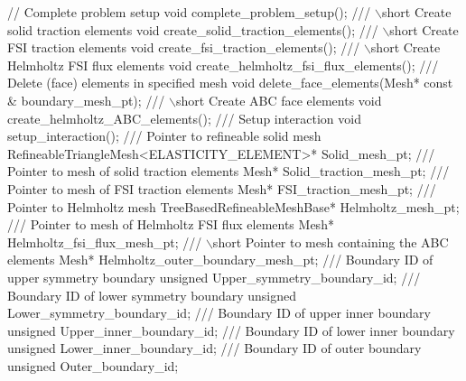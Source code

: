 \begin{DoxyCodeInclude}
 \textcolor{comment}{// Complete problem setup}
 \textcolor{keywordtype}{void} complete\_problem\_setup(); 
\textcolor{comment}{}
\textcolor{comment}{ /// \(\backslash\)short Create solid traction elements}
\textcolor{comment}{} \textcolor{keywordtype}{void} create\_solid\_traction\_elements();
\textcolor{comment}{}
\textcolor{comment}{ /// \(\backslash\)short Create FSI traction elements}
\textcolor{comment}{} \textcolor{keywordtype}{void} create\_fsi\_traction\_elements();
 \textcolor{comment}{}
\textcolor{comment}{ /// \(\backslash\)short Create Helmholtz FSI flux elements}
\textcolor{comment}{} \textcolor{keywordtype}{void} create\_helmholtz\_fsi\_flux\_elements();
\textcolor{comment}{}
\textcolor{comment}{ /// Delete (face) elements in specified mesh }
\textcolor{comment}{} \textcolor{keywordtype}{void} delete\_face\_elements(Mesh* \textcolor{keyword}{const} & boundary\_mesh\_pt);
 \textcolor{comment}{}
\textcolor{comment}{ /// \(\backslash\)short Create ABC face elements }
\textcolor{comment}{} \textcolor{keywordtype}{void} create\_helmholtz\_ABC\_elements();
\textcolor{comment}{}
\textcolor{comment}{ /// Setup interaction}
\textcolor{comment}{} \textcolor{keywordtype}{void} setup\_interaction();
\textcolor{comment}{}
\textcolor{comment}{ /// Pointer to refineable solid mesh}
\textcolor{comment}{} RefineableTriangleMesh<ELASTICITY\_ELEMENT>* Solid\_mesh\_pt;
\textcolor{comment}{}
\textcolor{comment}{ /// Pointer to mesh of solid traction elements}
\textcolor{comment}{} Mesh* Solid\_traction\_mesh\_pt;
\textcolor{comment}{}
\textcolor{comment}{ /// Pointer to mesh of FSI traction elements}
\textcolor{comment}{} Mesh* FSI\_traction\_mesh\_pt;
\textcolor{comment}{}
\textcolor{comment}{ /// Pointer to Helmholtz mesh}
\textcolor{comment}{} TreeBasedRefineableMeshBase* Helmholtz\_mesh\_pt;
\textcolor{comment}{}
\textcolor{comment}{ /// Pointer to mesh of Helmholtz FSI flux elements}
\textcolor{comment}{} Mesh* Helmholtz\_fsi\_flux\_mesh\_pt;
 \textcolor{comment}{}
\textcolor{comment}{ /// \(\backslash\)short Pointer to mesh containing the ABC elements}
\textcolor{comment}{} Mesh* Helmholtz\_outer\_boundary\_mesh\_pt;
 \textcolor{comment}{}
\textcolor{comment}{ /// Boundary ID of upper symmetry boundary}
\textcolor{comment}{} \textcolor{keywordtype}{unsigned} Upper\_symmetry\_boundary\_id;
\textcolor{comment}{}
\textcolor{comment}{ /// Boundary ID of lower symmetry boundary}
\textcolor{comment}{} \textcolor{keywordtype}{unsigned} Lower\_symmetry\_boundary\_id;
\textcolor{comment}{}
\textcolor{comment}{ /// Boundary ID of upper inner boundary}
\textcolor{comment}{} \textcolor{keywordtype}{unsigned} Upper\_inner\_boundary\_id;
\textcolor{comment}{}
\textcolor{comment}{ /// Boundary ID of lower inner boundary}
\textcolor{comment}{} \textcolor{keywordtype}{unsigned} Lower\_inner\_boundary\_id;
\textcolor{comment}{}
\textcolor{comment}{ /// Boundary ID of outer boundary}
\textcolor{comment}{} \textcolor{keywordtype}{unsigned} Outer\_boundary\_id;


\end{DoxyCodeInclude}
